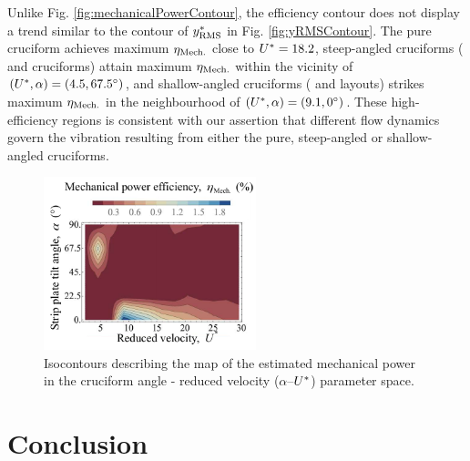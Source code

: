\documentclass[oneside]{utmthesis}
\begin{document}
Unlike Fig. \ref{fig:mechanicalPowerContour}, the efficiency contour does not display a trend similar to the contour of $y^{*}_{\text{RMS}}$ in Fig. \ref{fig:yRMSContour}. The pure cruciform achieves maximum $\eta_{\text{Mech.}}$ close to $U^{*} = 18.2$, steep-angled cruciforms (\angfo{} and \angth{} cruciforms) attain maximum $\eta_{\text{Mech.}}$ within the vicinity of $(\ured,\alpha) = (\urtw,\angfo)$, and shallow-angled cruciforms (\angtw{} and \angon{} layouts) strikes maximum $\eta_{\text{Mech.}}$ in the neighbourhood of $(\ured,\alpha) = (\urfo,\angon)$. These high-efficiency regions is consistent with our assertion that different flow dynamics govern the vibration resulting from either the pure, steep-angled or shallow-angled cruciforms.

\begin{figure}
  \centering
  \includegraphics[width=0.55\textwidth]{figs/powerEfficiencyContours}
  \caption{Isocontours describing the map of the estimated mechanical power in the cruciform angle - reduced velocity ($\alpha$--$U^{*}$) parameter space.}
  \label{fig:powerEfficiencyContour}
\end{figure}

\chapter{Conclusion}
\end{document}
